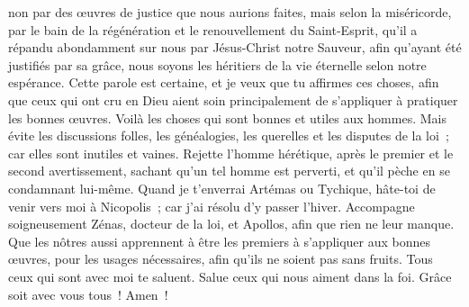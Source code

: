 \begin{multicols}{2}
non par des œuvres de justice que nous aurions faites, mais selon la miséricorde, par le bain de la régénération et le renouvellement du Saint-Esprit,
qu'il a répandu abondamment sur nous par Jésus-Christ notre Sauveur,
afin qu'ayant été justifiés par sa grâce, nous soyons les héritiers de la vie éternelle selon notre espérance.
Cette parole est certaine, et je veux que tu affirmes ces choses, afin que ceux qui ont cru en Dieu aient soin principalement de s'appliquer à pratiquer les bonnes œuvres. Voilà les choses qui sont bonnes et utiles aux hommes.
Mais évite les discussions folles, les généalogies, les querelles et les disputes de la loi~; car elles sont inutiles et vaines.
Rejette l'homme hérétique, après le premier et le second avertissement,
sachant qu'un tel homme est perverti, et qu'il pèche en se condamnant lui-même.
Quand je t'enverrai Artémas ou Tychique, hâte-toi de venir vers moi à Nicopolis~; car j'ai résolu d'y passer l'hiver.
Accompagne soigneusement Zénas, docteur de la loi, et Apollos, afin que rien ne leur manque.
Que les nôtres aussi apprennent à être les premiers à s'appliquer aux bonnes œuvres, pour les usages nécessaires, afin qu'ils ne soient pas sans fruits.
Tous ceux qui sont avec moi te saluent. Salue ceux qui nous aiment dans la foi. Grâce soit avec vous tous~! Amen~!
\PPE{}
\end{multicols}
